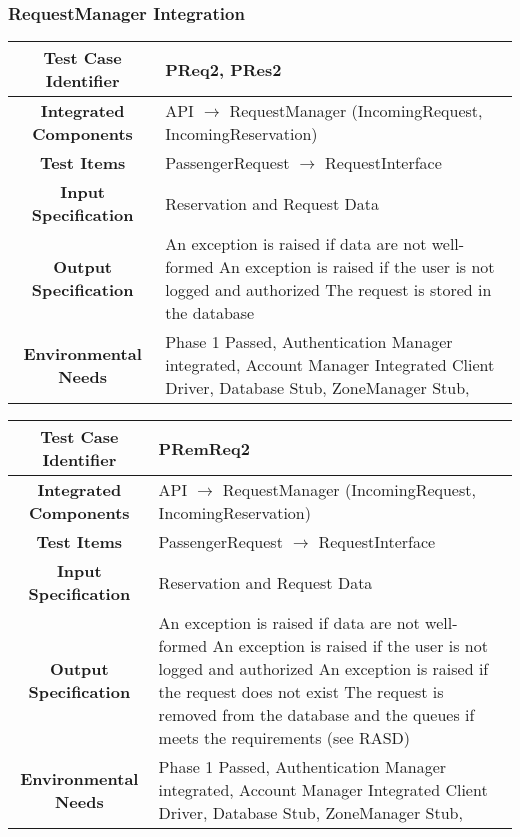 \documentclass[11pt, a4paper,titlepage]{article}
\begin{document}
	 \subsubsection{RequestManager Integration}
	 	\begin{tabularx}{\textwidth}{| c|X|}
	 		\hline \textbf{Test Case Identifier} & PReq2, PRes2 \\
	 		\hline \textbf{Integrated Components} & API  $\rightarrow $ RequestManager (IncomingRequest, IncomingReservation) \\
	 		\hline \textbf{Test Items} & PassengerRequest $\rightarrow $ RequestInterface \\
	 		\hline \textbf{Input Specification} & Reservation and Request Data \\
	 		\hline \textbf{Output Specification} & An exception is raised if data are not well-formed \newline
												   An exception is raised if the user is not logged and authorized \newline
												   The request is stored in the database\\
	 		\hline \textbf{Environmental Needs} &  Phase 1 Passed, Authentication Manager integrated, Account Manager Integrated \newline 
	 		Client Driver, Database Stub, ZoneManager Stub,\\
	 		\hline
	 	\end{tabularx}
	 	\newline
	 \begin{tabularx}{\textwidth}{| c|X|}
	 	\hline \textbf{Test Case Identifier} & PRemReq2 \\
	 	\hline \textbf{Integrated Components} & API  $\rightarrow $ RequestManager (IncomingRequest, IncomingReservation) \\
	 	\hline \textbf{Test Items} & PassengerRequest $\rightarrow $ RequestInterface \\
	 	\hline \textbf{Input Specification} & Reservation and Request Data \\
	 	\hline \textbf{Output Specification} & An exception is raised if data are not well-formed \newline
	 	An exception is raised if the user is not logged and authorized \newline
	 	An exception is raised if the request does not exist \newline
	 	The request is removed from the database and the queues if meets the requirements (see RASD)\\
	 	\hline \textbf{Environmental Needs} &  Phase 1 Passed, Authentication Manager integrated, Account Manager Integrated \newline 
	 	Client Driver, Database Stub, ZoneManager Stub,\\
	 	\hline
	 \end{tabularx}
	 \newline
	 
\end{document}

